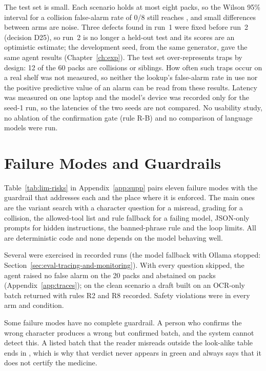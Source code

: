 The test set is small. Each scenario holds at most eight packs, so the Wilson 95\% interval for a collision false-alarm rate of 0/8 still reaches , and small differences between arms are noise. Three defects found in run~1 were fixed before run~2 (decision D25), so run~2 is no longer a held-out test and its scores are an optimistic estimate; the development seed, from the same generator, gave the same agent results (Chapter~\ref{ch:exp}). The test set over-represents traps by design: 12 of the 60 packs are collisions or siblings. How often such traps occur on a real shelf was not measured, so neither the lookup's false-alarm rate in use nor the positive predictive value of an alarm can be read from these results. Latency was measured on one laptop and the model's device was recorded only for the seed-1 run, so the latencies of the two seeds are not compared. No usability study, no ablation of the confirmation gate (rule R-B) and no comparison of language models were run.

\section{Failure Modes and Guardrails}
\label{sec:lim-failure-modes-and-guardrails}

Table~\ref{tab:lim-risks} in Appendix~\ref{app:supp} pairs eleven failure modes with the guardrail that addresses each and the place where it is enforced. The main ones are the variant search with a character question for a misread, grading for a collision, the allowed-tool list and rule fallback for a failing model, JSON-only prompts for hidden instructions, the banned-phrase rule and the loop limits. All are deterministic code and none depends on the model behaving well.

Several were exercised in recorded runs (the model fallback with Ollama stopped: Section~\ref{sec:eval-tracing-and-monitoring}). With every question skipped, the agent raised no false alarm on the 20 \NLISTED{} packs and abstained on  packs (Appendix~\ref{app:traces}); on the clean scenario a \FLAGGED{} draft built on an OCR-only batch returned \CANTV{} with rules R2 and R8 recorded. Safety violations were  in every arm and condition.

Some failure modes have no complete guardrail. A person who confirms the wrong character produces a wrong but confirmed batch, and the system cannot detect this. A listed batch that the reader misreads outside the look-alike table ends in \NLISTED{}, which is why that verdict never appears in green and always says that it does not certify the medicine.

